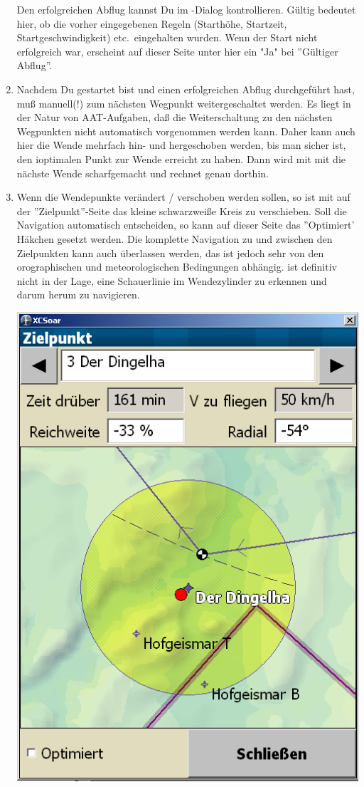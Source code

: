 \begin{enumerate}
Den erfolgreichen Abflug kannst Du im -Dialog kontrollieren.  Gültig bedeutet hier, ob die vorher eingegebenen
Regeln (Starthöhe, Startzeit, Startgeschwindigkeit) etc.\ eingehalten wurden.
Wenn der Start nicht erfolgreich war, erscheint auf dieser Seite unter  hier ein "Ja" bei ''Gültiger Abflug''.
\item  Nachdem Du gestartet bist und einen erfolgreichen Abflug durchgeführt hast, muß manuell(!) zum nächsten Wegpunkt weitergeschaltet
 werden.
 Es liegt in der Natur von AAT-Aufgaben, daß die Weiterschaltung zu den
nächsten Wegpunkten nicht automatisch vorgenommen werden kann.  Daher kann auch hier die Wende mehrfach hin- und hergeschoben werden, bis man sicher ist, den ioptimalen Punkt zur Wende erreicht zu haben.
Dann wird mit mit  die nächste Wende scharfgemacht und \xc rechnet genau dorthin.
\item Wenn die Wendepunkte verändert / verschoben werden sollen, so ist mit auf der ''Zielpunkt''-Seite  das kleine schwarzweiße Kreis zu verschieben.
 Soll \xc die Navigation automatisch entscheiden, so kann auf dieser Seite das ''Optimiert' Häkchen gesetzt werden.
Die komplette Navigation zu und zwischen den Zielpunkten kann auch \xc überlassen werden, das ist jedoch sehr
von den orographischen und meteorologischen Bedingungen  abhängig. \xc ist definitiv nicht in der Lage,
eine Schauerlinie im Wendezylinder zu erkennen und darum herum zu navigieren.
\begin{center}
\includegraphics[angle=0,width=0.75\linewidth,keepaspectratio='true']{figures/aat-target.png}

\end{center}
\end{enumerate}
